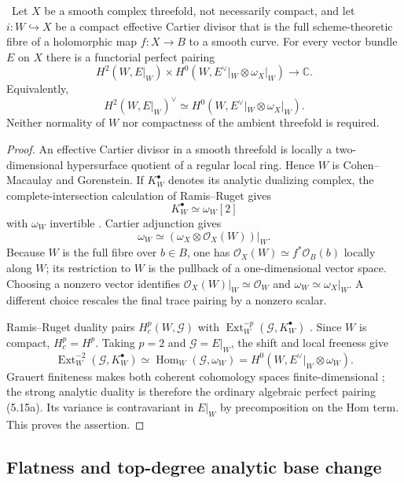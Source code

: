 \begin{proposition}
\label{prop:cartier-duality-absolute}
\Verified\ Let $X$ be a smooth complex threefold, not necessarily compact,
and let $i:W\hookrightarrow X$ be a compact effective Cartier divisor that
is the full scheme-theoretic fibre of a holomorphic map $f:X\to B$ to a
smooth curve.  For every vector bundle $E$ on $X$ there is a functorial
perfect pairing
\[
 H^2(W,E|_W)\times
 H^0(W,E^\vee|_W\otimes\omega_X|_W)\longrightarrow\mathbb C.
\]
Equivalently,
\[
 H^2(W,E|_W)^\vee\simeq
 H^0(W,E^\vee|_W\otimes\omega_X|_W).
\tag{5.15a}
\]
Neither normality of $W$ nor compactness of the ambient threefold is
required.
\end{proposition}

\begin{proof}
An effective Cartier divisor in a smooth threefold is locally a
two-dimensional hypersurface quotient of a regular local ring.  Hence $W$
is Cohen--Macaulay and Gorenstein.  If $K_W^\bullet$ denotes its analytic
dualizing complex, the complete-intersection calculation of Ramis--Ruget
gives
\[
 K_W^\bullet\simeq\omega_W[2]
\]
with $\omega_W$ invertible
\cite[Proposition~2 and the complete-intersection calculation,
pp.~90--91]{RamisRuget1970}.  Cartier adjunction gives
\[
 \omega_W\simeq
 (\omega_X\otimes\mathcal O_X(W))|_W.
\]
Because $W$ is the full fibre over $b\in B$, one has
$\mathcal O_X(W)\simeq f^*\mathcal O_B(b)$ locally along $W$; its
restriction to $W$ is the pullback of a one-dimensional vector space.
Choosing a nonzero vector identifies
$\mathcal O_X(W)|_W\simeq\mathcal O_W$ and
$\omega_W\simeq\omega_X|_W$.  A different choice rescales the final trace
pairing by a nonzero scalar.

Ramis--Ruget duality pairs $H_c^p(W,\mathcal G)$ with
$\operatorname{Ext}^{-p}_W(\mathcal G,K_W^\bullet)$
\cite[Theorem~2, pp.~82--83]{RamisRuget1970}.  Since $W$ is compact,
$H_c^p=H^p$.  Taking $p=2$ and $\mathcal G=E|_W$, the shift and local
freeness give
\[
 \operatorname{Ext}^{-2}_W(\mathcal G,K_W^\bullet)
 \simeq\operatorname{Hom}_W(\mathcal G,\omega_W)
 =H^0(W,E^\vee|_W\otimes\omega_W).
\]
Grauert finiteness makes both coherent cohomology spaces finite-dimensional
\cite{Grauert1960}; the strong analytic duality is therefore the ordinary
algebraic perfect pairing (5.15a).  Its variance is contravariant in $E|_W$
by precomposition on the Hom term.  This proves the assertion.
\end{proof}

\subsection{Flatness and top-degree analytic base change}


